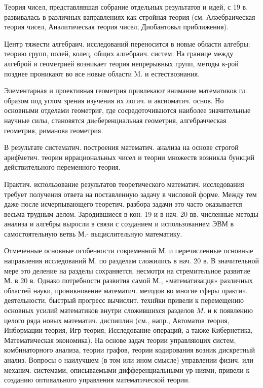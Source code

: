 \documentclass[10pt]{article}
\begin{document}
Теория чисел, представлявшая собрание отдельных результатов и идей, с 19 в. развивалась в различных ваправлениях как стройная теория (см. Аләебраическая теория чисел, Аналитическая теория чисел, Диобантовьл приближения).



Центр тяжести алгебраич. исследований переносится в новые области алгебры: теорию групп, полей, колец, общих алгебраич. систем. На границе между алгеброй и геометрией возникает теория непрерывных групп, методы к-рой позднее проникают во все новые области M. и естествознания.



Элементарная и проективная геометрия привлекают внимание математиков гл. образом под углом зрения изучения их логич. и аксиоматич. основ. Но основными отделами геометриғ, где сосредоточиваются наиболее значительные научные силы, становятся диøберенциальная геометрия, алгебрачческая геометрия, риманова геометрия.



В результате систематич. построения математич. анализа на основе строгой ариф̆метич. теории иррациональных чисел и теории множеств возникла бункций действительного переменного теория.



Практич. использование результатов теоретического математич. исследования требует получения ответа на поставленную задачу в числовой форме. Между тем даже после исчерпывающего теоретич. разбора задачи это часто оказывается весьма трудным делом. Зародившиеся в кон. 19 и в нач. 20 вв. численные методы анализа и алгебры выросли в связи с созданием и использованием ЭВМ в самостоятельную ветвь М.- выцислительную математику.



Отмеченные основные особенности современной М. и перечисленные основные направления исследований М. по разделам сложились в нач. 20 в. В значительной мере это деление на разделы сохраняется, несмотря на стремительное развитие М. в 20 в. Однако потребности развития самой М., «математизацця» различных областей науки, проникновение математич. методов во многие сферы практич. деятельности, быстрый прогресс вычислит. технйки привели к перемещению основных усилий математиков внутри сложившихся разделов $M$. и к появлению целого ряда новых математич. диспиплин (см., напр., Автоматов теория, Инбормации теория, Игр теория, Исследование операций, а также Кибернетика, Математическая экономика). На основе задач теории управляюцих систем, комбинаторного анализа, теории графов, теории кодирования возник дискретный анализ. Вопросы о наилучшем (в том или ином смысле) управлении физич. или механич. системами, описываемыми дифференциальными ур-ниями, привели к созданию оптияального управления математической теории.
\end{document}
